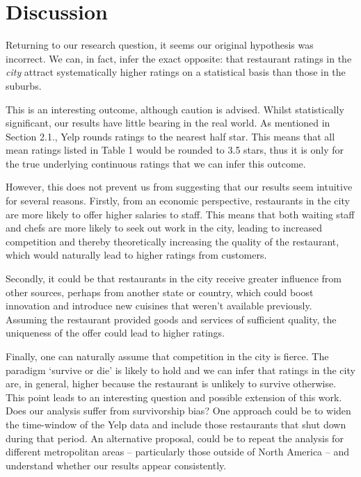 \documentclass{article}
\begin{document}
\section{Discussion}
Returning to our research question, it seems our original hypothesis was incorrect. We can, in fact, infer the exact opposite: that restaurant ratings in the \textit{city} attract systematically higher ratings on a statistical basis than those in the suburbs. \par

This is an interesting outcome, although caution is advised. Whilst statistically significant, our results have little bearing in the real world. As mentioned in Section 2.1., Yelp rounds ratings to the nearest half star. This means that all mean ratings listed in Table 1 would be rounded to 3.5 stars, thus it is only for the true underlying continuous ratings that we can infer this outcome. \par

However, this does not prevent us from suggesting that our results seem  intuitive for several reasons. Firstly, from an economic perspective, restaurants in the city are more likely to offer higher salaries to staff. This means that both waiting staff and chefs are more likely to seek out work in the city, leading to increased competition and thereby theoretically increasing the quality of the restaurant, which would naturally lead to higher ratings from customers. \par

Secondly, it could be that restaurants in the city receive greater influence from other sources, perhaps from another state or country, which could boost innovation and introduce new cuisines that weren't available previously. Assuming the restaurant provided goods and services of sufficient quality, the uniqueness of the offer could lead to higher ratings. \par

Finally, one can naturally assume that competition in the city is fierce. The paradigm `survive or die' is likely to hold and we can infer that ratings in the city are, in general, higher because the restaurant is unlikely to survive otherwise. This point leads to an interesting question and possible extension of this work. Does our analysis suffer from survivorship bias? One approach could be to widen the time-window of the Yelp data and include those restaurants that shut down during that period. An alternative proposal, could be to repeat the analysis for different metropolitan areas – particularly those outside of North America – and understand whether our results appear consistently. \par



\end{document}
